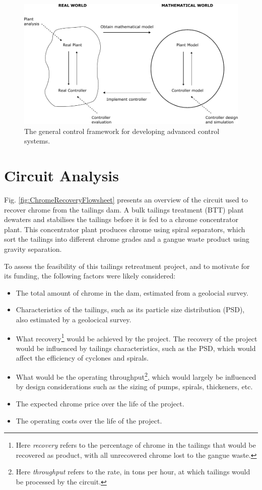 \documentclass[preprint,authoryear,12pt]{elsarticle}
\begin{document}
\begin{figure}[h!]
	\centering
	\includegraphics[width=5.2in]{GeneralControlFramework.pdf}
	\caption{The general control framework for developing advanced control systems.}
	\label{fig:GeneralControlFramework}
\end{figure}

\section{Circuit Analysis}\label{sec:CircuitAnalysis}
Fig. \ref{fig:ChromeRecoveryFlowsheet} presents an overview of the circuit used to recover chrome from the tailings dam. A bulk tailings treatment (BTT) plant dewaters and stabilises the tailings before it is fed to a chrome concentrator plant. This concentrator plant produces chrome using spiral separators, which sort the tailings into different chrome grades and a gangue waste product using gravity separation. 
 
To assess the feasibility of this tailings retreatment project, and to motivate for its funding, the following factors were likely considered:
\begin{itemize}
	\item The total amount of chrome in the dam, estimated from a geolocial survey.
	\item Characteristics of the tailings, such as its particle size distribution (PSD), also estimated by a geolocical survey.
	\item What recovery\footnote{Here \emph{recovery} refers to the percentage of chrome in the tailings that would be recovered as product, with all unrecovered chrome lost to the gangue waste.} would be achieved by the project. The recovery of the project would be influenced by tailings characteristics, such as the PSD, which would affect the efficiency of cyclones and spirals. 
	\item What would be the operating throughput\footnote{Here \emph{throughput} refers to the rate, in tons per hour, at which tailings would be processed by the circuit.}, which would largely be influenced by design considerations such as the sizing of pumps, spirals, thickeners, etc.
	\item The expected chrome price over the life of the project.
	\item The operating costs over the life of the project.
\end{itemize} 
\end{document}
